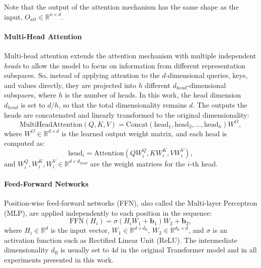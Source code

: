 Note that the output of the attention mechanism has the same shape as the input, $O_{att} \in \mathbb{R}^{n \times d}$.

\paragraph{Multi-Head Attention}
Multi-head attention extends the attention mechanism with multiple independent \emph{heads} to allow the model to focus on information from different representation subspaces. So, instead of applying attention to the $d$-dimensional queries, keys, and values directly, they are projected into $h$ different $d_{head}$-dimensional subspaces, where $h$ is the number of heads. In this work, the head dimension $d_{head}$ is set to $d/h$, so that the total dimensionality remains $d$. The outputs the heads are concatenated and linearly transformed to the original dimensionality:
\begin{equation*}
    \text{MultiHeadAttention}(Q, K, V) = \text{Concat}(\text{head}_1, \text{head}_2, \dots, \text{head}_h) W^O,
\end{equation*}
where $W^O \in \mathbb{R}^{d \times d}$ is the learned output weight matrix, and each head is computed as:
\begin{equation*}
    \text{head}_i = \text{Attention}(Q W_i^Q, K W_i^K, V W_i^V),
\end{equation*}
and $W_i^Q, W_i^K, W_i^V \in \mathbb{R}^{d \times d_{head}}$ are the weight matrices for the $i$-th head.

\paragraph{Feed-Forward Networks}

Position-wise feed-forward networks (FFN), also called the Multi-layer Perceptron (MLP), are applied independently to each position in the sequence:
\begin{equation*}
    \text{FFN}(H_i) = \sigma(H_i W_1 + \mathbf{b}_1) W_2 + \mathbf{b}_2,
\end{equation*}
where $H_i \in \mathbb{R}^d$ is the input vector, $W_1 \in \mathbb{R}^{d \times d_{\text{ff}}}$, $W_2 \in \mathbb{R}^{d_{\text{ff}} \times d}$, and $\sigma$ is an activation function such as Rectified Linear Unit (ReLU). The intermediate dimensionality $d_{\text{ff}}$ is usually set to $4d$ in the original Transformer model and in all experiments presented in this work.

